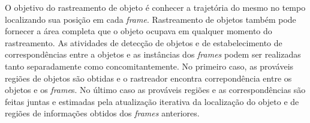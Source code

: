 	O objetivo do rastreamento de objeto é conhecer a trajetória do mesmo no tempo localizando sua posição em cada \textit{frame}. Rastreamento de objetos também pode fornecer a área completa que o objeto ocupava em qualquer momento do rastreamento. As atividades de detecção de objetos e de estabelecimento de correspondências entre a objetos e as instâncias dos \textit{frames} podem ser realizadas tanto separadamente como concomitantemente. No primeiro caso, as prováveis regiões de objetos são obtidas e o rastreador encontra correpondência entre os objetos e os \textit{frame}s. No último caso as prováveis regiões e as correspondências são feitas juntas e estimadas pela atualização iterativa da localização do objeto e de regiões de informações obtidos dos \textit{frames} anteriores.






